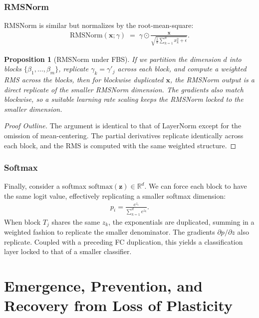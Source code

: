 \documentclass[11pt]{article}
\newtheorem{proposition}{Proposition}[section]
\begin{document}
\subsubsection{RMSNorm}
RMSNorm is similar but normalizes by the root-mean-square:
\begin{align*}
  \mathrm{RMSNorm}(\mathbf{x};\gamma)
  \;=\;
  \gamma \odot \frac{\mathbf{x}}{\sqrt{\tfrac{1}{d}\sum_{k=1}^d x_k^2 + \epsilon}}.
\end{align*}

\begin{proposition}[RMSNorm under FBS]
\label{prop:RMS_FBS}
If we partition the dimension $d$ into blocks $\{\beta_1,\dots,\beta_m\}$, replicate $\gamma_k=\gamma'_j$ across each block, and compute a weighted RMS across the blocks, then for blockwise duplicated $\mathbf{x}$, the RMSNorm output is a direct replicate of the smaller RMSNorm dimension. The gradients also match blockwise, so a suitable learning rate scaling keeps the RMSNorm locked to the smaller dimension.
\end{proposition}

\begin{proof}[Proof Outline]
The argument is identical to that of LayerNorm except for the omission of mean-centering. The partial derivatives replicate identically across each block, and the RMS is computed with the same weighted structure.
\end{proof}

\subsubsection{Softmax}
Finally, consider a softmax $\mathrm{softmax}(\mathbf{z})\in\mathbb{R}^d$. We can force each block to have the same logit value, effectively replicating a smaller softmax dimension:
\begin{align*}
  p_i 
  =
  \frac{e^{z_i}}{\sum_{k=1}^d e^{z_k}}.
\end{align*}
When block $T_j$ shares the same $z_k$, the exponentials are duplicated, summing in a weighted fashion to replicate the smaller denominator. The gradients $\partial p/\partial z$ also replicate. Coupled with a preceding FC duplication, this yields a classification layer locked to that of a smaller classifier.


\section{Emergence, Prevention, and Recovery from Loss of Plasticity}
\end{document}
